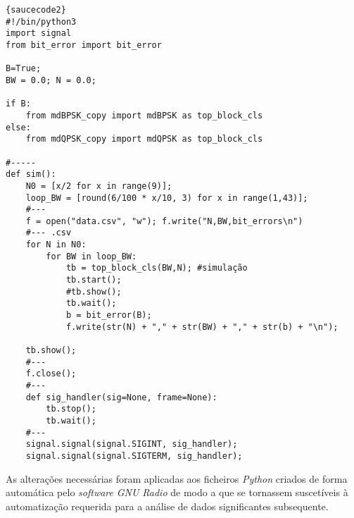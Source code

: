 \begin{lstlisting}[caption=\textit{Source code}: \color{white}{\underline{\textit{Script} responsável pela automatização da comparação de ficheiros} (sim.py)}, frame=tlrb]{saucecode2}
#!/bin/python3
import signal
from bit_error import bit_error 

B=True;
BW = 0.0; N = 0.0;

if B:
    from mdBPSK_copy import mdBPSK as top_block_cls
else:
    from mdQPSK_copy import mdQPSK as top_block_cls

#-----
def sim():
    N0 = [x/2 for x in range(9)];
    loop_BW = [round(6/100 * x/10, 3) for x in range(1,43)];
    #---
    f = open("data.csv", "w"); f.write("N,BW,bit_errors\n")
    #--- .csv
    for N in N0:
        for BW in loop_BW:
            tb = top_block_cls(BW,N); #simulação
            tb.start();
            #tb.show();
            tb.wait();
            b = bit_error(B);
            f.write(str(N) + "," + str(BW) + "," + str(b) + "\n");

    tb.show();
    #---
    f.close();
    #---
    def sig_handler(sig=None, frame=None):
        tb.stop();
        tb.wait();
    #---
    signal.signal(signal.SIGINT, sig_handler);
    signal.signal(signal.SIGTERM, sig_handler);
\end{lstlisting}

As alterações necessárias foram aplicadas aos ficheiros \textit{Python} criados de forma automática pelo \textit{software} \textit{GNU Radio} de modo a que se tornassem suscetíveis à automatização requerida para a análise de dados significantes subsequente.

\label{sec:analise}

